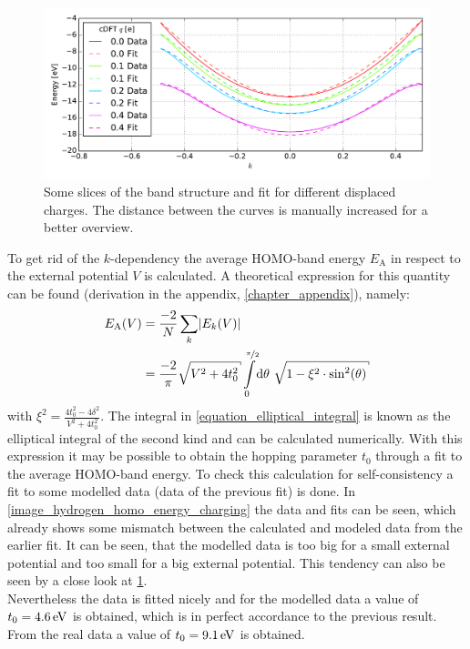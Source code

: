 \begin{figure}
	\centering
	\includegraphics[width = 13cm]{Images/Hydrogen/charging/3D_cuts}
	\caption{Some slices of the band structure and fit for different displaced charges. The distance between the curves is manually increased for a better overview.}
	\label{image_hydrogen_3D_slices}
\end{figure}
\newpage To get rid of the $k$-dependency the average HOMO-band energy $E_\text{A}$ in respect to the external potential $V$ is calculated. A theoretical expression for this quantity can be found (derivation in the appendix, \cref{chapter_appendix}), namely:
\begin{align}
	E_\text{A}(V) &= \frac{-2}{N}\sum_k \left|E_k(V)\right|\\
				  &= \frac{-2}{\pi}\sqrt{V^2+4t_0^2}\int\limits_0^{\nicefrac{\pi}{2}}\dd\theta\ \sqrt{1-\xi^2\cdot\sin^2(\theta)}
				  \label{equation_elliptical_integral}
\end{align}
with $\xi^2 = \frac{4t_0^2-4\delta^2}{V^2+4t_0^2}$. The integral in \cref{equation_elliptical_integral} is known as the elliptical integral of the second kind and can be calculated numerically. With this expression it may be possible to obtain the hopping parameter $t_0$ through a fit to the average HOMO-band energy. To check this calculation for self-consistency a fit to some modelled data (data of the previous fit) is done. In \cref{image_hydrogen_homo_energy_charging} the data and fits can be seen, which already shows some mismatch between the calculated and modeled data from the earlier fit. It can be seen, that the modelled data is too big for a small external potential and too small for a big external potential. This tendency can also be seen by a close look at \cref{image_hydrogen_3D_slices}.\\
Nevertheless the data is fitted nicely and for the modelled data a value of $t_0 = \unit[4.6]{eV}$ is obtained, which is in perfect accordance to the previous result. From the real data a value of $t_0 = \unit[9.1]{eV}$ is obtained.\\
